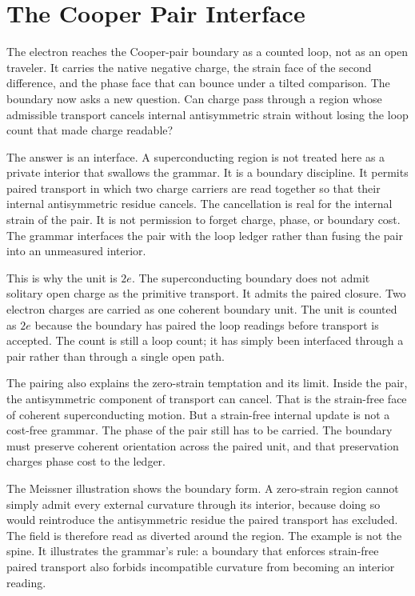 \section{The Cooper Pair Interface}

The electron reaches the Cooper-pair boundary as a counted loop, not as an
open traveler. It carries the native negative charge, the strain face of the
second difference, and the phase face that can bounce under a tilted
comparison. The boundary now asks a new question. Can charge pass through a
region whose admissible transport cancels internal antisymmetric strain
without losing the loop count that made charge readable?

The answer is an interface. A superconducting region is not treated here as a
private interior that swallows the grammar. It is a boundary discipline. It
permits paired transport in which two charge carriers are read together so
that their internal antisymmetric residue cancels. The cancellation is real
for the internal strain of the pair. It is not permission to forget charge,
phase, or boundary cost. The grammar interfaces the pair with the loop
ledger rather than fusing the pair into an unmeasured interior.

This is why the unit is \(2e\). The superconducting boundary does not admit
solitary open charge as the primitive transport. It admits the paired
closure. Two electron charges are carried as one coherent boundary unit. The
unit is counted as \(2e\) because the boundary has paired the loop readings
before transport is accepted. The count is still a loop count; it has simply
been interfaced through a pair rather than through a single open path.

The pairing also explains the zero-strain temptation and its limit. Inside
the pair, the antisymmetric component of transport can cancel. That is the
strain-free face of coherent superconducting motion. But a strain-free
internal update is not a cost-free grammar. The phase of the pair still has
to be carried. The boundary must preserve coherent orientation across the
paired unit, and that preservation charges phase cost to the ledger.

The Meissner illustration shows the boundary form. A zero-strain region
cannot simply admit every external curvature through its interior, because
doing so would reintroduce the antisymmetric residue the paired transport
has excluded. The field is therefore read as diverted around the region.
The example is not the spine. It illustrates the grammar's rule: a boundary
that enforces strain-free paired transport also forbids incompatible
curvature from becoming an interior reading.

